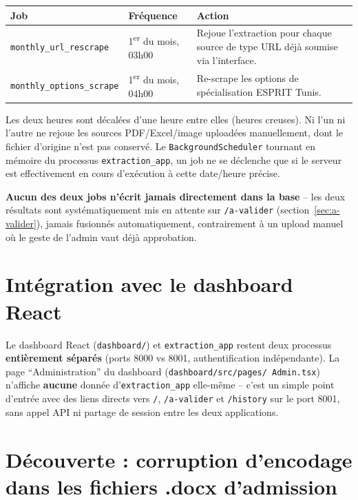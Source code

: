 \documentclass[11pt,a4paper]{report}
\begin{document}
\begin{center}
\begin{tabular}{@{}p{3.6cm}p{2.8cm}p{7.5cm}@{}}
\toprule
\textbf{Job} & \textbf{Fréquence} & \textbf{Action} \\
\midrule
\texttt{monthly\_url\_rescrape} & 1\textsuperscript{er} du mois, 03h00 & Rejoue
l'extraction pour chaque source de type URL déjà soumise via l'interface. \\
\texttt{monthly\_options\_scrape} & 1\textsuperscript{er} du mois, 04h00 & Re-scrape les
options de spécialisation ESPRIT Tunis. \\
\bottomrule
\end{tabular}
\end{center}
Les deux heures sont décalées d'une heure entre elles (heures creuses). Ni l'un ni
l'autre ne rejoue les sources PDF/Excel/image uploadées manuellement, dont le fichier
d'origine n'est pas conservé. Le \texttt{BackgroundScheduler} tournant en mémoire du
processus \texttt{extraction\_app}, un job ne se déclenche que si le serveur est
effectivement en cours d'exécution à cette date/heure précise.

\begin{noteinfo}
\textbf{Aucun des deux jobs n'écrit jamais directement dans la base} -- les deux
résultats sont systématiquement mis en attente sur \texttt{/a-valider}
(section~\ref{sec:a-valider}), jamais fusionnés automatiquement, contrairement à un
upload manuel où le geste de l'admin vaut déjà approbation.
\end{noteinfo}

\section{Intégration avec le dashboard React}
Le dashboard React (\texttt{dashboard/}) et \texttt{extraction\_app} restent deux
processus \textbf{entièrement séparés} (ports 8000 vs 8001, authentification
indépendante). La page ``Administration'' du dashboard (\texttt{dashboard/src/pages/
Admin.tsx}) n'affiche \textbf{aucune} donnée d'\texttt{extraction\_app} elle-même --
c'est un simple point d'entrée avec des liens directs vers \texttt{/}, \texttt{/a-valider}
et \texttt{/history} sur le port 8001, sans appel API ni partage de session entre les
deux applications.

\section{Découverte : corruption d'encodage dans les fichiers .docx d'admission}
\end{document}

